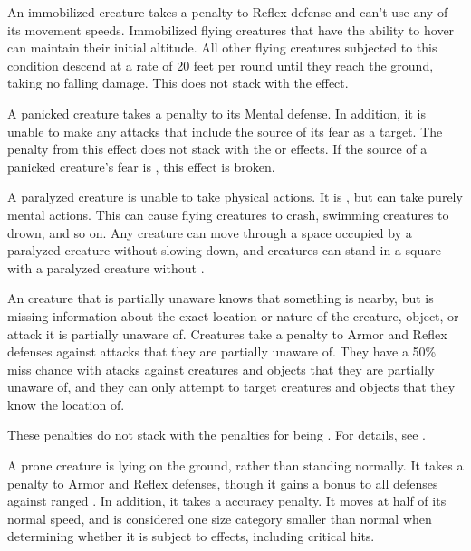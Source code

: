      An immobilized creature takes a  penalty to Reflex defense and can't use any of its movement speeds.
    Immobilized flying creatures that have the ability to hover can maintain their initial altitude.
    All other flying creatures subjected to this condition descend at a rate of 20 feet per round until they reach the ground, taking no falling damage.
    This does not stack with the \slowed effect.

     A panicked creature takes a  penalty to its Mental defense.
    In addition, it is unable to make any attacks that include the source of its fear as a target.
    The penalty from this effect does not stack with the \frightened or \panicked effects.
    If the source of a panicked creature's fear is , this effect is broken.

     A paralyzed creature is unable to take physical actions. It is \helpless, but can take purely mental actions. This can cause flying creatures to crash, swimming creatures to drown, and so on. Any creature can move through a space occupied by a paralyzed creature without slowing down, and creatures can stand in a square with a paralyzed creature without \squeezing.

     An creature that is partially unaware knows that something is nearby, but is missing information about the exact location or nature of the creature, object, or attack it is partially unaware of.
    Creatures take a  penalty to Armor and Reflex defenses against attacks that they are partially unaware of.
    They have a 50\% miss chance with  atacks against creatures and objects that they are partially unaware of, and they can only attempt to target creatures and objects that they know the location of.

    These penalties do not stack with the penalties for being \unaware.
    For details, see .

     A prone creature is lying on the ground, rather than standing normally.
    It takes a  penalty to Armor and Reflex defenses, though it gains a  bonus to all defenses against ranged .
    In addition, it takes a  accuracy penalty.
    It moves at half of its normal speed, and is considered one size category smaller than normal when determining whether it is subject to  effects, including critical hits.

